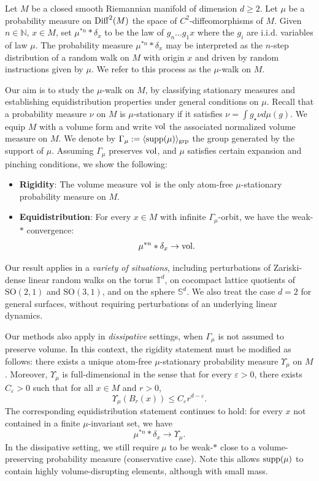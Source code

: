 \documentclass[11pt, leqno, fleqn]{amsart}
\def\eps{\varepsilon}
\def \N{{\mathbb N}}
\theoremstyle{definition}
\theoremstyle{definition}
\def\supp{{\rm supp}}
\def\S{ {\mathbb{S}} }
\def \vol{  {\rm vol} }
\newcommand{\Diff}{{\rm Diff}}
\begin{document}
	
Let $M$ be a closed smooth Riemannian manifold of dimension $d\geq2$. Let $\mu$ be a probability measure on $\Diff^2(M)$ the space of $C^2$-diffeomorphisms of $M$. Given $n\in \N$, $x \in M$, set $\mu^{*n}*\delta_{x}$ to be the law of $g_{n}\dots g_{1}x$ where the $g_{i}$ are i.i.d. variables of law $\mu$. The probability measure  $\mu^{*n}*\delta_{x}$ may be interpreted as the $n$-step distribution of a random walk on $M$ with origin $x$ and driven by random  instructions   given by  $\mu$. We refer to this process as the $\mu$-walk on $M$. 


	


Our aim  is to study the $\mu$-walk on $M$, by classifying stationary measures and establishing equidistribution properties under  general 
 conditions on $\mu$. Recall that a probability measure $\nu$ on $M$ is $\mu$-stationary if it satisfies $\nu =\int    g_{\star}   \nu d\mu(g)$.   We equip $M$ with a volume form and write $\vol$ the associated normalized volume measure on $M$. We denote by $\Gamma_{\mu}:=\langle \supp(\mu) \rangle_{\text{grp}}$  the group generated by the support of $\mu$. Assuming $\Gamma_{\mu}$ preserves  $\vol$, 
 and $\mu$ satisfies certain expansion and pinching conditions, we  show the following:
\begin{itemize}
\item[(a)] {\bf Rigidity}: The volume measure $\vol$ is the only atom-free $\mu$-stationary probability measure on $M$. 

\bigskip
\item[(b)] {\bf Equidistribution}:  For every $x\in M$ with infinite $\Gamma_{\mu}$-orbit, we have the weak-$*$ convergence:
$$\mu^{*n}*\delta_{x}\rightarrow \vol. $$
\end{itemize}

Our result applies in a \emph{variety of situations}, including perturbations of Zariski-dense linear random walks on the torus $\mathbb{T}^d$, on cocompact lattice quotients of $\mathrm{SO}(2,1)$ and $\mathrm{SO}(3,1)$, and on the sphere $\S^d$. We also treat the case $d=2$ for general surfaces, without requiring perturbations of an underlying linear dynamics.




Our methods also apply in \emph{dissipative} settings,  when $\Gamma_\mu$ is not assumed to preserve volume. In this context, the rigidity statement must be modified as follows: there exists a unique atom-free  $\mu$-stationary probability measure $\Upsilon_\mu$ on $M$. Moreover, $ \Upsilon_{\mu}$ is full-dimensional in the sense that for every $\varepsilon>0$, there exists $C_{\varepsilon}>0$ such that for all $x\in M$ and $r>0$,
$$ \Upsilon_{\mu}(B_{r}(x))\leq C_{\varepsilon} r^{d-\eps}.$$
The corresponding equidistribution statement continues to hold: for every $x$ not contained in a finite $\mu$-invariant set, we have
$$\mu^{*n}*\delta_{x}\rightarrow \Upsilon_{\mu}.$$
In the dissipative setting, we still require $\mu$ to be weak-$*$ close to a volume-preserving probability measure (conservative case). Note this  allows $\supp(\mu)$ to contain highly  volume-disrupting elements, although with small mass. 
\bigskip
\end{document}
